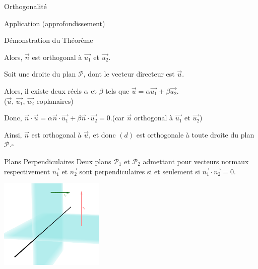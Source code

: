 \documentclass{cours}
\begin{document}
\begin{Gpartie}{Orthogonalité}
\begin{Spartie}{Application (approfondissement)}
\begin{SSpartie}{Démonstration du Théorème}
\begin{itemize}[leftmargin=7ex]
                    Alors, $\vec{n}$ est orthogonal à $\vec{u_1}$ et $\vec{u_2}$.

                    Soit une droite du plan $\mathcal{P}$, dont le vecteur directeur est $\vec{u}$.

                    Alors, il existe deux réels $\alpha$ et $\beta$ tels que $\vec{u}=\alpha\vec{u_1}+\beta\vec{u_2}$. \\ ($\vec{u}$, $\vec{u_1}$, $\vec{u_2}$ coplanaires)

                    Donc, $\vec{n}\cdot\vec{u}=\alpha\vec{n}\cdot\vec{u_1}+\beta\vec{n}\cdot\vec{u_2}=0$.\quad (car $\vec{n}$ orthogonal à $\vec{u_1}$ et $\vec{u_2}$)

                    Ainsi, $\vec{n}$ est orthogonal à $\vec{u}$, et donc $(d)$ est orthogonale à toute droite du plan~$\mathcal{P}$.\quad$\square$
                \end{itemize}
            \end{SSpartie}
        \end{Spartie}
        \begin{Spartie}{Plans Perpendiculaires} 
            Deux plans $\mathcal{P}_1$ et $\mathcal{P}_2$ admettant pour vecteurs normaux respectivement $\vec{n_1}$ et $\vec{n_2}$ sont perpendiculaires si et seulement si $\vec{n_1}\cdot\vec{n_2}=0$.

            \begin{center}
                \includegraphics[width=5cm]{rsc/12fig7.png}
                \parbox{\linewidth}{}
            \end{center}
        \end{Spartie}
    \end{Gpartie}
\end{document}
